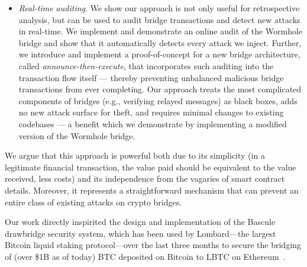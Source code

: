 \begin{itemize}
\item\emph{Real-time auditing}.  We show our approach is not only
  useful for retrospective analysis, but can be used to audit bridge
  transactions and detect new attacks in real-time. We implement and
  demonstrate an online audit of the Wormhole bridge and show that it
  automatically detects every attack we inject.  Further, we introduce
  and implement a proof-of-concept for a new bridge architecture,
  called \emph{announce-then-execute}, that incorporates such auditing
  into the transaction flow itself --- thereby preventing unbalanced
  malicious bridge transactions from ever completing.  Our approach
  treats the most complicated components of bridges (e.g., verifying
  relayed messages) as black boxes, adds no new attack surface for
  theft, and requires minimal changes to existing codebases --- a benefit
  which we demonstrate by implementing a modified version of the
  Wormhole bridge.
\end{itemize}

We argue that this approach is powerful both due to its simplicity (in a
legitimate financial transaction, the value paid should be equivalent
to the value received, less costs) and its independence from the
vagaries of smart contract details.  Moreover, it represents a
straightforward mechanism that can prevent an entire class of
existing attacks on crypto bridges.

Our work directly inspirited the design and implementation of the Bascule
drawbridge security system, which has been used by Lombard---the largest
Bitcoin
 liquid staking protocol---over the last three months to secure the
bridging of
 (over \$1B as of today) BTC deposited on Bitcoin to LBTC on
Ethereum~\cite{bascule}.


